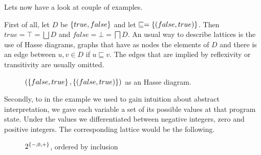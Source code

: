 \documentclass[..thesis.tex]{subfiles}
\begin{document}

Lets now have a look at couple of examples. 

First of all, let $D$ be $\left\lbrace true, false \right\rbrace$ and let $\sqsubseteq = \left\lbrace \left( false, true \right) \right\rbrace$. Then $true = \top = \bigsqcup D$ and $false = \bot = \bigsqcap D$. An usual way to describe lattices is the use of Hasse diagrams, graphs that have as nodes the elements of $D$ and there is an edge between $u, v \in D$ if $u \sqsubseteq v$. The edges that are implied by reflexivity or transitivity are usually omitted.

\begin{figure}[H]
  \begin{center}
  \end{center}
  \caption{$\left( \left\lbrace false, true \right\rbrace, \left\lbrace \left( false, true \right) \right\rbrace \right)$ as an Hasse diagram.}
\end{figure}
 
Secondly, to in the example we used to gain intuition about abstract interpretation, we gave each variable a set of its possible values at that program state. Under the values we differentiated between negative integers, zero and positive integers. The corresponding lattice would be the following.


\begin{figure}[H]
  \begin{center}
  \end{center}
  \caption{$2^{\left\lbrace -, 0, + \right\rbrace}$, ordered by inclusion}
\end{figure}
\end{document}
